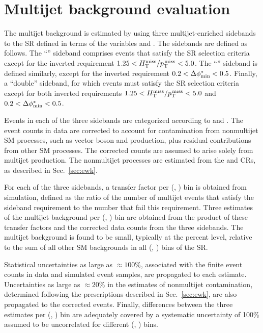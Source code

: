
\clearpage
\section{Multijet background evaluation}
\label{sec:qcd}

The multijet background is estimated by using three multijet-enriched
sidebands to the SR defined in terms of the variables \mhtmet and
\bdphi. The sidebands are defined as follows. The ``\mhtmet'' sideband
comprises events that satisfy the SR selection criteria except for the
inverted requirement $1.25 < H_{\text{T}}^{\text{miss}} / p_{\text{T}}^{\kern1pt\text{miss}} < 5.0$. The ``\bdphi'' sideband
is defined similarly, except for the inverted requirement $0.2 <
\Delta\phi^{*}_\text{min} < 0.5$. Finally, a ``double'' sideband, for which events must
satisfy the SR selection criteria except for both inverted
requirements $1.25 < H_{\text{T}}^{\text{miss}} / p_{\text{T}}^{\kern1pt\text{miss}} < 5.0$ and $0.2 < \Delta\phi^{*}_\text{min} < 0.5$.

Events in each of the three sidebands are categorized according to
\njet and \scalht. The event counts in data are corrected to account
for contamination from nonmultijet SM processes, such as vector boson
and \ttbar production, plus residual contributions from other SM
processes. The corrected counts are assumed to arise solely from
multijet production. The nonmultijet processes are estimated from the
\mj and \mmj CRs, as described in Sec.~\ref{sec:ewk}.

For each of the three sidebands, a transfer factor per (\njet,
\scalht) bin is obtained from simulation, defined as the ratio of the
number of multijet events that satisfy the sideband requirement to the
number that fail this requirement. Three estimates of the multijet
background per (\njet, \scalht) bin are obtained from the product of
these transfer factors and the corrected data counts from the three
sidebands. The multijet background is found to be small, typically at
the percent level, relative to the sum of all other SM backgrounds in
all (\njet, \nb) bins of the SR.

Statistical uncertainties as large as ${\approx}100\%$, associated
with the finite event counts in data and simulated event samples, are
propagated to each estimate. Uncertainties as large as ${\approx}20\%$
in the estimates of nonmultijet contamination, determined following
the prescriptions described in Sec.~\ref{sec:ewk}, are also propagated
to the corrected events. Finally, differences between the three
estimates per (\njet, \scalht) bin are adequately covered by a
systematic uncertainty of 100\% assumed to be uncorrelated for
different (\njet, \scalht) bins.

